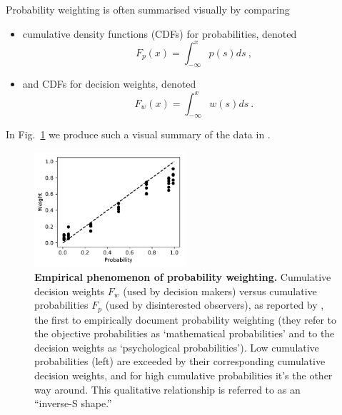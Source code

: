 \documentclass[a4paper, 12pt]{article}
\newcommand{\bi}{\begin{itemize}}
\newcommand{\ei}{\end{itemize}}
\newcommand{\elabel}[1]{\label{eq:#1}}
\newcommand{\flabel}[1]{\label{fig:#1}}
\newcommand{\fref}[1]{Fig.~\ref{fig:#1}}
\newcommand{\be}{\begin{equation}}
\newcommand{\ee}{\end{equation}}
\begin{document}
Probability weighting is often summarised visually by comparing 
\bi
\item cumulative density functions (CDFs) for probabilities, denoted 
\be
\elabel{DO_CDF}
F_p(x)=\int_{-\infty}^x p(s) ds~,
\ee
\item and CDFs for decision weights, denoted
\be
\elabel{DM_CDF}
F_w(x)=\int_{-\infty}^x w(s) ds~.
\ee
\ei
In \fref{PB1948} we produce such a visual summary of the data in \textcite[188]{PrestonBaratta1948}.
\begin{figure}[!htb]
\centering
\includegraphics[width=0.5\textwidth]{./figs/PB48_2.pdf}
\caption{\textbf{Empirical phenomenon of probability weighting.} Cumulative decision weights $F_w$ (used by decision makers) versus cumulative probabilities $F_p$ (used by disinterested observers), as reported by \textcite{PrestonBaratta1948}, the first to empirically document probability weighting (they refer to the objective probabilities as `mathematical probabilities' and to the decision weights as `psychological probabilities'). 
Low cumulative probabilities (left) are exceeded by their corresponding cumulative decision weights, and for high cumulative probabilities it's the other way around. This qualitative relationship is referred to as an ``inverse-S shape.''}
\flabel{PB1948}
\end{figure}
\end{document}
